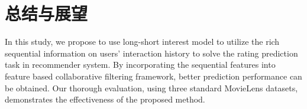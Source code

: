 \chapter{总结与展望}

In this study, we propose to use long-short interest model to utilize the rich
sequential information on users' interaction history to solve the rating
prediction task in recommender system.
By incorporating the sequential features into feature based collaborative
filtering framework, better prediction performance can be obtained.
Our thorough evaluation, using three standard MovieLens datasets, demonstrates
the effectiveness of the proposed method.